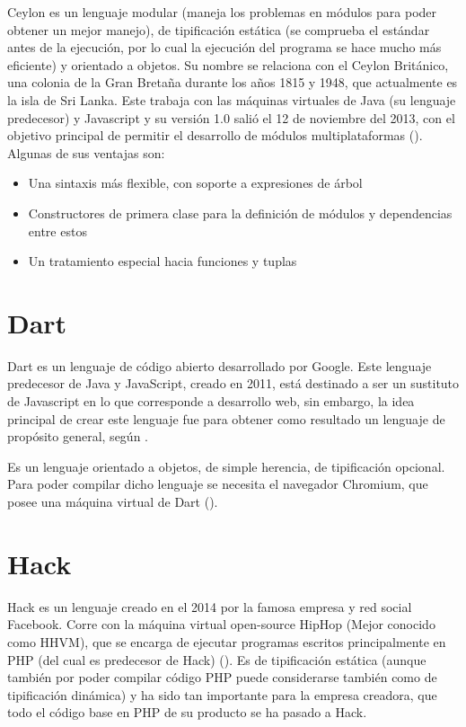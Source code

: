 \documentclass[a4paper,11pt]{article}
\begin{document}
Ceylon es un lenguaje modular (maneja los problemas en módulos para poder obtener un mejor manejo), de tipificación estática (se comprueba el estándar antes de la ejecución, por lo cual la ejecución del programa se hace mucho más eficiente) y orientado a objetos. Su nombre se relaciona con el Ceylon Británico, una colonia de la Gran Bretaña durante los años 1815 y 1948, que actualmente es la isla de Sri Lanka. Este trabaja con las máquinas virtuales de Java (su lenguaje predecesor) y Javascript y su versión 1.0 salió el 12 de noviembre del 2013, con el
objetivo principal de permitir el desarrollo de módulos multiplataformas (\cite{King}). Algunas de sus ventajas son:
\begin{itemize}
  \item Una sintaxis más flexible, con soporte a expresiones de árbol
  \item Constructores de primera clase para la definición de módulos y dependencias entre estos
  \item Un tratamiento especial hacia funciones y tuplas
\end{itemize}

\section{Dart}

Dart es un lenguaje de código abierto desarrollado por Google. Este lenguaje predecesor de Java y JavaScript, creado en 2011, está destinado a ser un sustituto de Javascript en lo que corresponde a desarrollo web, sin embargo, la idea principal de crear este lenguaje fue para obtener como resultado un lenguaje de propósito general, según \cite{Lardinois}.

Es un lenguaje orientado a objetos, de simple herencia, de tipificación opcional. Para poder compilar dicho lenguaje se necesita el navegador Chromium, que posee una máquina virtual de Dart (\cite{James}).

\section{Hack}

Hack es un lenguaje creado en el 2014 por la famosa empresa y red social Facebook. Corre con la máquina virtual open-source HipHop (Mejor conocido como HHVM), que se encarga de ejecutar programas escritos principalmente en PHP (del cual es predecesor de Hack) (\cite{HHVM}). Es de tipificación estática (aunque también por poder compilar código PHP puede considerarse también como de tipificación dinámica) y ha sido tan importante para la empresa creadora, que todo el código base en PHP de su producto se ha pasado a Hack.
\end{document}
